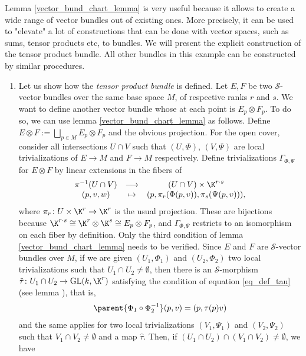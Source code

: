 \begin{example} \label{ex_vector_bundle_constructions}
    Lemma \ref{vector_bund_chart_lemma} is very useful because it allows to create a wide range of vector bundles out of existing ones. More precisely, it can be used to "elevate" a lot of constructions that can be done with vector spaces, such as sums, tensor products etc, to bundles. We will present the explicit construction of the tensor product bundle. All other bundles in this example can be constructed by similar procedures.
    \begin{enumerate}
        \item Let us show how the \textit{tensor product bundle} is defined. Let \(E, F\) be two \(\mathcal{S}\)-vector bundles over the same base space \(M\), of respective ranks \(r\) and \(s\). We want to define another vector bundle whose at each point is \(E_p \otimes F_p\). To do so, we can use lemma \ref{vector_bund_chart_lemma} as follows. Define \(E \otimes F:=\bigsqcup_{p \in M} E_p \otimes F_p\) and the obvious projection. For the open cover, consider all intersections \(U \cap V\) such that \((U, \Phi)\), \((V, \Psi)\) are local trivializations of \(E \to M\) and \(F \to M\) respectively. Define trivializations \(\Gamma_{\Phi,\Psi}\) for \(E \otimes F\) by linear extensions in the fibers of
    \[
    \begin{array}{cccc}
          \pi^{-1}(U \cap V) & \longrightarrow & (U \cap V) \times \K^{r\cdot s}\\
         (p, v, w) & \mapsto &(p, \pi_r(\Phi(p,v)), \pi_s(\Psi(p,v))),
    \end{array}
    \] 
    where \(\pi_r\colon U \times \K^r \to \K^r\) is the usual projection. These are bijections because \(\K^{r\cdot s} \cong \K^r \otimes \K^s \cong E_p \otimes F_p\), and \(\Gamma_{\Phi,\Psi}\) restricts to an isomorphism on each fiber by definition. Only the third condition of lemma \ref{vector_bund_chart_lemma} needs to be verified. Since \(E\) and \(F\) are \(\mathcal{S}\)-vector bundles over \(M\), if we are given \((U_1, \Phi_1)\) and \((U_2, \Phi_2)\) two local trivializations such that \(U_1 \cap U_2 \neq \emptyset\), then there is an \(\mathcal{S}\)-morphism \(\tilde{\tau}\colon U_1 \cap U_2 \to \mathrm{GL}(k, \K^r)\) satisfying the condition of equation \eqref{eq_def_tau} (see lemma \parencite[Lemma 10.5]{intro_leeSM}), that is,
    \[
    \parent{\Phi_1 \circ \Phi_2^{-1}}(p, v) = (p, \tau(p)v)
    \]
    and the same applies for two local trivializations \((V_1, \Psi_1)\) and \((V_2, \Psi_2)\) such that \(V_1 \cap V_2 \neq \emptyset\) and a map \(\hat{\tau}\). Then, if \((U_1 \cap U_2) \cap (V_1 \cap V_2) \neq \emptyset\), we have

\end{enumerate}
\end{example}

